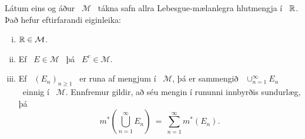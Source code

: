\documentclass[12pt]{report}
\begin{document}
\begin{setn*}
\smallskip
Látum eins og áður \ $\mathcal{M}$ \ tákna safn allra Lebesgue-mælanlegra hlutmengja í \ $\mathbb{R}$. Það hefur eftirfarandi eiginleika:
\begin{enumerate}[(i)]
\smallskip
\item
$\mathbb{R}\in\mathcal{M}$.
\item
Ef \ $E\in\mathcal{M}$ \ þá \ $E^c\in\mathcal{M}$.
\item
Ef \ $(E_n)_{n\geq 1}$ \ er runa af mengjum í \ $\mathcal{M}$, þá er sammengið \ $\cup_{n=1}^\infty E_n$ \ einnig í \ $\mathcal{M}$. Ennfremur gildir, að séu mengin í rununni innbyrðis sundurlæg, þá 
\[
m^*\left(\bigcup_{n=1}^{\infty}E_n\right) \ = \ \sum_{n=1}^{\infty}m^*(E_n).
\]
\end{enumerate}
\end{setn*}
\end{document}
